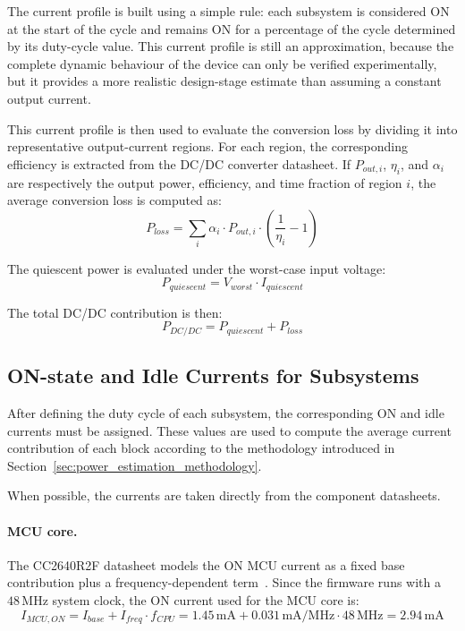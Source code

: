 The current profile is built using a simple rule: each subsystem is considered ON at the start of the cycle and remains ON for a percentage of the cycle determined by its duty-cycle value. 
This current profile is still an approximation, because the complete dynamic behaviour of the device can only be verified experimentally, but it provides a more realistic design-stage estimate than assuming a constant output current.

This current profile is then used to evaluate the conversion loss by dividing it into representative output-current regions. 
For each region, the corresponding efficiency is extracted from the DC/DC converter datasheet. 
If \(P_{out,i}\), \(\eta_i\), and \(\alpha_i\) are respectively the output power, efficiency, and time fraction of region \(i\), the average conversion loss is computed as:
\begin{equation}
	P_{loss} = \sum_i \alpha_i \cdot P_{out,i} \cdot \left(\frac{1}{\eta_i} - 1\right)
\end{equation}

The quiescent power is evaluated under the worst-case input voltage:
\begin{equation}
	P_{quiescent} = V_{worst} \cdot I_{quiescent}
\end{equation}

The total DC/DC contribution is then:
\begin{equation}
	P_{DC/DC} = P_{quiescent} + P_{loss}
\end{equation}



\subsection{ON-state and Idle Currents for Subsystems}
\label{sec:on_idle_currents_subsystems}

After defining the duty cycle of each subsystem, the corresponding ON and idle currents must be assigned. 
These values are used to compute the average current contribution of each block according to the methodology introduced in Section~\ref{sec:power_estimation_methodology}.

When possible, the currents are taken directly from the component datasheets.

\paragraph{MCU core.}
The CC2640R2F datasheet models the ON MCU current as a fixed base contribution plus a frequency-dependent term~\cite{mcu_datasheet}. 
Since the firmware runs with a \(48\,\mathrm{MHz}\) system clock, the ON current used for the MCU core is:
\begin{equation}
	I_{MCU,ON} = I_{base} + I_{freq} \cdot f_{CPU}
	= 1.45\,\mathrm{mA} + 0.031\,\mathrm{mA/MHz} \cdot 48\,\mathrm{MHz}
	= 2.94\,\mathrm{mA}
\end{equation}

